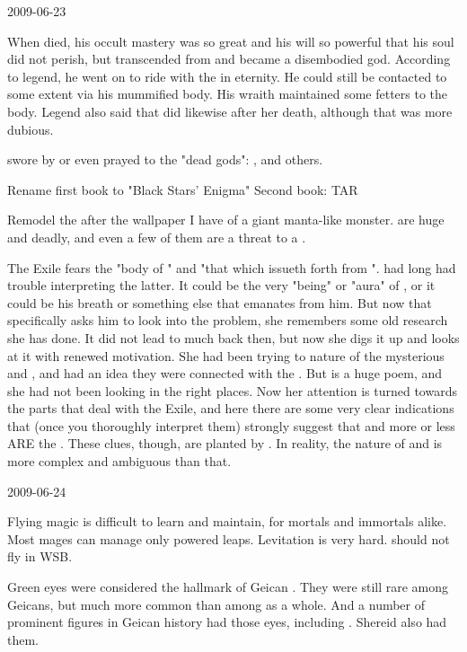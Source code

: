 2009-06-23

When \Sethicus died, his occult mastery was so great and his will so powerful that his soul did not perish, but transcended from \Miith and became a disembodied god.
According to legend, he went on to ride with the \xss in eternity.
He could still be contacted to some extent via his mummified body.
His wraith maintained some fetters to the body.
Legend also said that \Xserasshana did likewise after her death, although that was more dubious.

\Dragons swore by or even prayed to the "dead gods": 
\Sethicus, \Xserasshana and others.

Rename first book to "Black Stars' Enigma"
Second book: TAR

Remodel the \umbrae after the wallpaper I have of a giant manta-like monster. 
\umbrae are huge and deadly, and even a few of them are a threat to a \dragon.

The Exile fears the "body of \Zaz" and "that which issueth forth from \Urzaz".
\Urizeth had long had trouble interpreting the latter.
It could be the very "being" or "aura" of \Urzaz, or it could be his breath or something else that emanates from him.
But now that \Teshrial specifically asks him to look into the problem, she remembers some old research she has done.
It did not lead to much back then, but now she digs it up and looks at it with renewed motivation.
She had been trying to nature of the mysterious \Zaz and \Urzaz, and had an idea they were connected with the \Chimaera.
But \WanderersInDarknessEmph is a huge poem, and she had not been looking in the right places.
Now her attention is turned towards the parts that deal with the Exile, and here there are some very clear indications that (once you thoroughly interpret them) strongly suggest that \Zaz and \Urzaz more or less ARE the \Chimaera.
These clues, though, are planted by \Ishnaruchaefir.
In reality, the nature of \Zaz and \Urzaz is more complex and ambiguous than that.



2009-06-24

Flying magic is difficult to learn and maintain, for mortals and immortals alike.
Most mages can manage only powered leaps.
Levitation is very hard.
\Achsah should not fly in WSB.

Green eyes were considered the hallmark of Geican \humans.
They were still rare among Geicans, but much more common than among \humans as a whole.
And a number of prominent figures in Geican history had those eyes, including \Belzir.
Shereid also had them.

